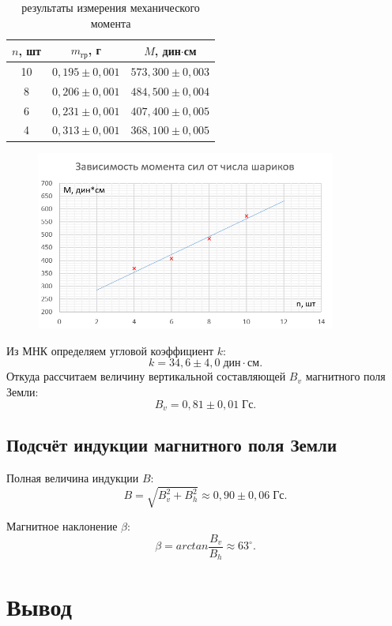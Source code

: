 \documentclass[a4paper]{article}
\theoremstyle{definition}
\theoremstyle{remark}
\begin{document}
\begin{table}[h!]
    \centering
    \begin{tabular}{|c|c|c|}
    \hline
    $n$, шт & $m_{\text{гр}}$, г & $M$, дин$\cdot$см    \\ \hline
    10      & $0,195 \pm 0,001$                  & $573, 300 \pm 0,003$ \\ \hline
    8       & $0,206 \pm 0,001$                  & $484,500 \pm 0,004$  \\ \hline
    6       & $0,231 \pm 0,001$                  & $407,400 \pm 0,005$  \\ \hline
    4       & $0,313 \pm 0,001$                  & $368,100 \pm 0,005$  \\ \hline
    \end{tabular}
    \caption{результаты измерения механического момента}
    \end{table}

    \begin{figure}[h!]
        \centering
        \includegraphics[width = 280pt]{image/graph2.png}
    \end{figure}

    \noindent Из МНК определяем угловой коэффициент $k$: $$k = 34,6 \pm 4,0 \;\text{дин}\cdot\text{см}.$$ Откуда рассчитаем величину вертикальной составляющей $B_v$ магнитного поля Земли: $$B_v = 0,81 \pm 0,01 \;\text{Гс}.$$

\subsection{Подсчёт индукции магнитного поля Земли}

Полная величина индукции $B$:
$$B = \sqrt{B_v^2+B_h^2} \approx 0,90 \pm 0,06\;\text{Гс}.$$

\noindent Магнитное наклонение $\beta$: 
$$\beta = arctan{\frac{B_v}{B_h}} \approx 63^\circ.$$

\section{Вывод}
\end{document}
